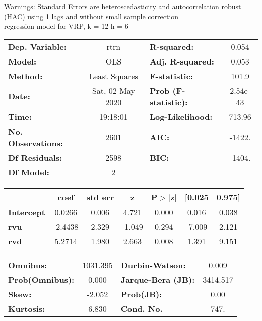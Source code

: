 Warnings: \newline
 [1] Standard Errors are heteroscedasticity and autocorrelation robust (HAC) using 1 lags and without small sample correction\\ 

regression model for VRP, k = 12 h = 6\begin{center}
\begin{tabular}{lclc}
\toprule
\textbf{Dep. Variable:}    &       rtrn       & \textbf{  R-squared:         } &     0.054   \\
\textbf{Model:}            &       OLS        & \textbf{  Adj. R-squared:    } &     0.053   \\
\textbf{Method:}           &  Least Squares   & \textbf{  F-statistic:       } &     101.9   \\
\textbf{Date:}             & Sat, 02 May 2020 & \textbf{  Prob (F-statistic):} &  2.54e-43   \\
\textbf{Time:}             &     19:18:01     & \textbf{  Log-Likelihood:    } &    713.96   \\
\textbf{No. Observations:} &        2601      & \textbf{  AIC:               } &    -1422.   \\
\textbf{Df Residuals:}     &        2598      & \textbf{  BIC:               } &    -1404.   \\
\textbf{Df Model:}         &           2      & \textbf{                     } &             \\
\bottomrule
\end{tabular}
\begin{tabular}{lcccccc}
                   & \textbf{coef} & \textbf{std err} & \textbf{z} & \textbf{P$> |$z$|$} & \textbf{[0.025} & \textbf{0.975]}  \\
\midrule
\textbf{Intercept} &       0.0266  &        0.006     &     4.721  &         0.000        &        0.016    &        0.038     \\
\textbf{rvu}       &      -2.4438  &        2.329     &    -1.049  &         0.294        &       -7.009    &        2.121     \\
\textbf{rvd}       &       5.2714  &        1.980     &     2.663  &         0.008        &        1.391    &        9.151     \\
\bottomrule
\end{tabular}
\begin{tabular}{lclc}
\textbf{Omnibus:}       & 1031.395 & \textbf{  Durbin-Watson:     } &    0.009  \\
\textbf{Prob(Omnibus):} &   0.000  & \textbf{  Jarque-Bera (JB):  } & 3414.517  \\
\textbf{Skew:}          &  -2.052  & \textbf{  Prob(JB):          } &     0.00  \\
\textbf{Kurtosis:}      &   6.830  & \textbf{  Cond. No.          } &     747.  \\
\bottomrule
\end{tabular}
\end{center}

